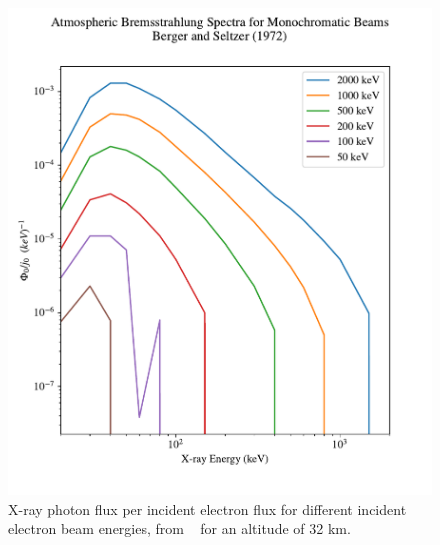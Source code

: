\begin{figure}[p]
\label{berger_seltzer_curves_0}
\centering
\includegraphics[width=1.0\textwidth]{figures/chapter_3/berger-seltzer-curves/berger_seltzer_curves_0}
\caption{X-ray photon flux per incident electron flux for different incident electron beam energies, from ~\cite{Berger1972} for an altitude of 32 km.}
\end{figure}

